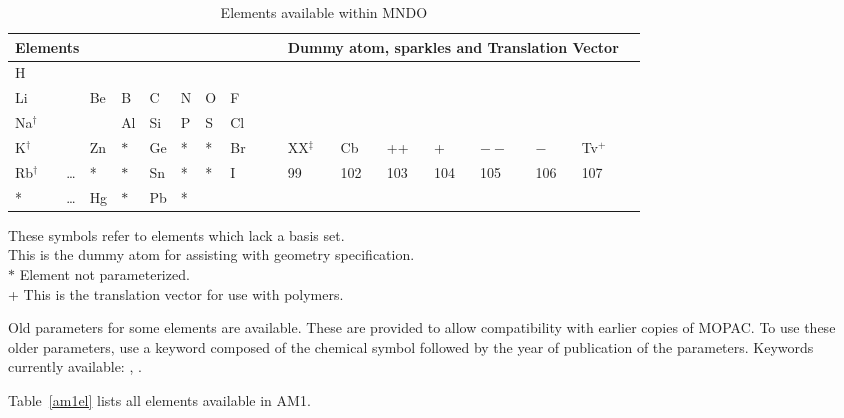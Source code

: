 \begin{table}
\begin{center}
\caption{\label{mndoel} Elements available within MNDO}
\hspace*{-0.3in} \compresstable
\begin{tabular}{lllllllllllllllllll}
\multicolumn{7}{l}{Elements}&&&&&\multicolumn{7}{l}{Dummy atom, sparkles and
 Translation Vector} \\
\hline
   H  \\
  Li &&   & Be& B& C& N& O& F           \\
  Na$^{\dag}$&&   &   &Al&Si& P& S&Cl &&&       &                         \\
   K$^{\dag}$&& & Zn&$ *$&Ge& *& *&Br &&&     XX$^{\ddag}$& Cb& ++&  +& $--$&  $-$& Tv$^+$  \\
  Rb$^{\dag}$&&\ldots&  *&$ *$&Sn& *& *& I &&&     99&102&103&104&105&106&107  \\
  *  &&\ldots& Hg&$ *$&Pb& *&   \\
\hline
\end{tabular}
\end{center}
\dag  These symbols refer to elements which lack a basis set.  \\
\ddag  This is the dummy atom for assisting with geometry specification.  \\
$*$  Element not parameterized.  \\
+  This is the translation vector for use with polymers.  \\
\end{table}

 Old parameters for some
elements are available.  These are  provided to  allow compatibility with
earlier copies of MOPAC.  To use these older parameters, use a keyword composed
of the chemical symbol followed by the year  of  publication  of  the
parameters.  Keywords currently available: , .

Table~\ref{am1el} lists all elements available in AM1.

